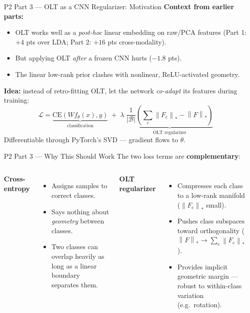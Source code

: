 \documentclass[10pt,aspectratio=169]{beamer}
\newcommand{\nuc}[1]{\left\|#1\right\|_{\ast}}
\begin{document}

\begin{frame}{P2 Part 3 --- OLT as a CNN Regularizer: Motivation}
\textbf{Context from earlier parts:}
\begin{itemize}
\item OLT works well as a \emph{post-hoc} linear embedding on raw/PCA features
      (Part 1: $+4$ pts over LDA; Part 2: $+16$ pts cross-modality).
\item But applying OLT \emph{after} a frozen CNN hurts ($-1.8$ pts).
\item The linear low-rank prior clashes with nonlinear, ReLU-activated geometry.
\end{itemize}

\bigskip
\textbf{Idea:} instead of retro-fitting OLT, let the network
\emph{co-adapt} its features during training:
\[
\mathcal{L}=\underbrace{\mathrm{CE}(Wf_\theta(x),y)}_{\text{classification}}
\;+\;\lambda\;\underbrace{\frac{1}{|\mathcal{B}|}\!\left(
\sum_c\nuc{F_c}-\nuc{F}\right)}_{\text{OLT regularizer}}
\]
Differentiable through PyTorch's SVD --- gradient flows to $\theta$.
\end{frame}

\begin{frame}{P2 Part 3 --- Why This Should Work}
The two loss terms are \textbf{complementary}:

\bigskip
\begin{columns}[T]
\textbf{Cross-entropy}
\begin{itemize}
\item Assigns samples to correct classes.
\item Says nothing about \emph{geometry} between classes.
\item Two classes can overlap heavily as long as a linear boundary separates them.
\end{itemize}

\textbf{OLT regularizer}
\begin{itemize}
\item Compresses each class to a low-rank manifold ($\nuc{F_c}$ small).
\item Pushes class subspaces toward orthogonality ($\nuc{F} \to \sum_c\nuc{F_c}$).
\item Provides implicit geometric margin --- robust to within-class variation (e.g.\ rotation).
\end{itemize}
\end{columns}
\end{frame}
\end{document}
